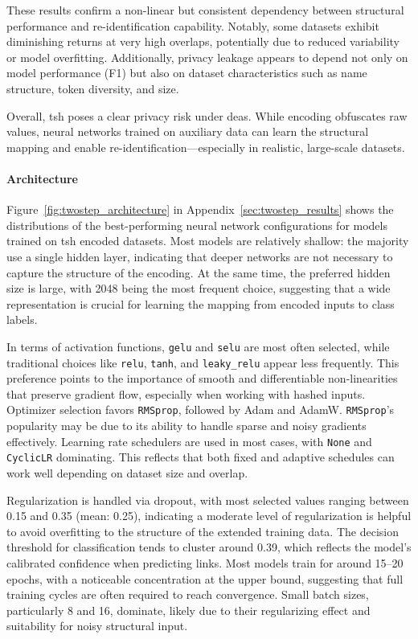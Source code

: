 These results confirm a non-linear but consistent dependency between structural performance and re-identification capability.
Notably, some datasets exhibit diminishing returns at very high overlaps, potentially due to reduced variability or model overfitting.
Additionally, privacy leakage appears to depend not only on model performance (F1) but also on dataset characteristics such as name structure, token diversity, and size.

Overall, \ac{tsh} poses a clear privacy risk under \ac{dea}s.
While encoding obfuscates raw values, neural networks trained on auxiliary data can learn the structural mapping and enable re-identification—especially in realistic, large-scale datasets.

\paragraph{Architecture}

Figure~\ref{fig:twostep_architecture} in Appendix~\ref{sec:twostep_results} shows the distributions of the best-performing neural network configurations for models trained on \ac{tsh} encoded datasets.
Most models are relatively shallow: the majority use a single hidden layer, indicating that deeper networks are not necessary to capture the structure of the encoding.
At the same time, the preferred hidden size is large, with 2048 being the most frequent choice, suggesting that a wide representation is crucial for learning the mapping from encoded inputs to class labels.

In terms of activation functions, \texttt{gelu} and \texttt{selu} are most often selected, while traditional choices like \texttt{relu}, \texttt{tanh}, and \texttt{leaky\_relu} appear less frequently.
This preference points to the importance of smooth and differentiable non-linearities that preserve gradient flow, especially when working with hashed inputs.
Optimizer selection favors \texttt{RMSprop}, followed by Adam and AdamW.
\texttt{RMSprop}'s popularity may be due to its ability to handle sparse and noisy gradients effectively.
Learning rate schedulers are used in most cases, with \texttt{None} and \texttt{CyclicLR} dominating.
This reflects that both fixed and adaptive schedules can work well depending on dataset size and overlap.

Regularization is handled via dropout, with most selected values ranging between 0.15 and 0.35 (mean: 0.25), indicating a moderate level of regularization is helpful to avoid overfitting to the structure of the extended training data.
The decision threshold for classification tends to cluster around 0.39, which reflects the model's calibrated confidence when predicting links.
Most models train for around 15–20 epochs, with a noticeable concentration at the upper bound, suggesting that full training cycles are often required to reach convergence.
Small batch sizes, particularly 8 and 16, dominate, likely due to their regularizing effect and suitability for noisy structural input.

